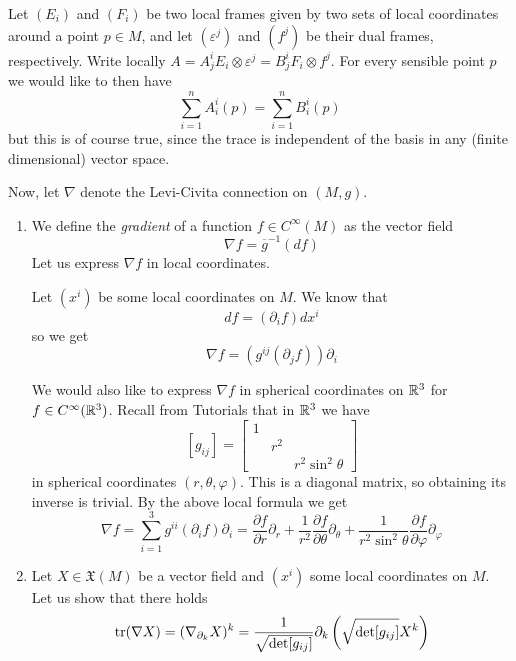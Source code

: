 \documentclass[a4paper, 12pt]{article}
\begin{document}
\begin{Exercise}
\begin{enumerate}[label=(\alph*)]
            Let $(E_i)$ and $(F_i)$ be two local frames given by two sets of local coordinates around a point $p \in M$,
            and let $(\varepsilon^j)$ and $(f^j)$ be their dual frames, respectively.
            Write locally $A = A_j^iE_i\otimes\varepsilon^j = B_j^iF_i\otimes f^j$.
            For every sensible point $p$ we would like to then have
            \[
                \sum_{i = 1}^{n} A_i^i(p) = \sum_{i = 1}^{n}B_i^i(p)
            \]
            but this is of course true, since the trace is independent of the basis in any (finite dimensional) vector space.
    \end{enumerate}
    Now, let $\nabla$ denote the Levi-Civita connection on $(M, g)$.
    \begin{enumerate}[label=(\roman*)]
        \item We define the \emph{gradient} of a function $f \in C^\infty(M)$ as the vector field
            \[
                \nabla f = \overline{g}^{-1}(df)
            \]
            Let us express $\nabla f$ in local coordinates.

            Let $(x^i)$ be some local coordinates on $M$.
            We know that
            \[
                df = (\partial_i f) dx^i
            \]
            so we get
            \[
                \nabla f = (g^{ij}(\partial_j f)) \partial_i
            \]
            
            We would also like to express $\nabla f$ in spherical coordinates on $\mathbb{R}^3$ for $f \in C^\infty(\mathbb{R}^3)$.
            Recall from Tutorials that in $\mathbb{R}^3$ we have
            \[
                [g_{ij}] =
                \begin{bmatrix}
                    1 & & \\
                    & r^2 & \\
                    & & r^2\sin^2\theta
                \end{bmatrix}
            \]
            in spherical coordinates $(r, \theta, \varphi)$.
            This is a diagonal matrix, so obtaining its inverse is trivial.
            By the above local formula we get
            \[
                \nabla f
                = \sum_{i = 1}^{3} g^{ii} (\partial_if) \partial_i
                = \frac{\partial f}{\partial r} \partial_r + \frac{1}{r^2}\frac{\partial f}{\partial\theta} \partial_\theta + \frac{1}{r^2\sin^2\theta}\frac{\partial f}{\partial\varphi}\partial_\varphi
            \]
        \item Let $X \in \mathfrak{X}(M)$ be a vector field and $(x^i)$ some local coordinates on $M$.
            Let us show that there holds
            \[
                \operatorname{tr}(\nabla X) = (\nabla_{\partial_k}X)^k = \frac{1}{\sqrt{\det[g_{ij}]}} \partial_k\left( \sqrt{\det[g_{ij}]} X^k \right)
            \]
            

\end{enumerate}
\end{Exercise}
\end{document}
